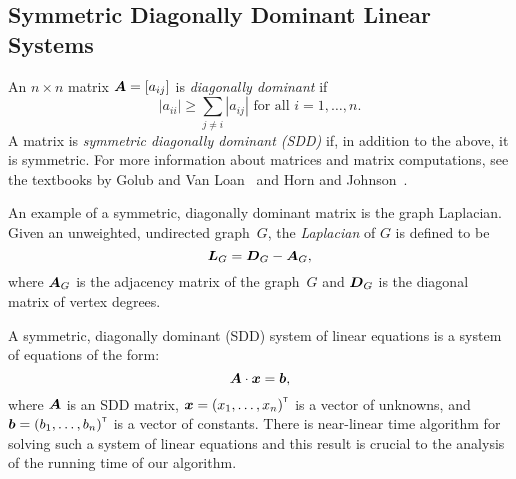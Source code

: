 \subsection{Symmetric Diagonally Dominant Linear Systems}

An $n \times n$ matrix $\boldsymbol{A} = [a_{ij}]$ is \emph{diagonally dominant} if 
\[
	|a_{ii}| \geq \sum_{j \neq i} {|a_{ij}|} \mbox{ for all } i = 1, \ldots, n.
\] 
A matrix is \emph{symmetric diagonally dominant (SDD)} if, in addition to the above, 
it is symmetric. For more information about matrices and matrix computations, 
see the textbooks by Golub and Van Loan~\cite{GvL13} and Horn and Johnson~\cite{HJ13}. 

An example of a symmetric, diagonally dominant matrix is the graph Laplacian. 
Given an unweighted, undirected graph~$G$, the \emph{Laplacian} of $G$ 
is defined to be 
\[
\boldsymbol{L}_G = \boldsymbol{D}_G - \boldsymbol{A}_G,
\] 
where $\boldsymbol{A}_G$ is the adjacency matrix of the graph~$G$ and $\boldsymbol{D}_G$ 
is the diagonal matrix of vertex degrees. 


A symmetric, diagonally dominant (SDD) system of linear equations is a system of 
equations of the form:
\[
	\boldsymbol{A} \cdot \boldsymbol{x} = \boldsymbol{b},
\]
where $\boldsymbol{A}$ is an SDD matrix, $\boldsymbol{x} = {(x_1, \ldots, x_n)}^{\scriptscriptstyle \mathsf{T}}$ 
is a vector of unknowns, and $\boldsymbol{b} = {(b_1, \ldots, b_n)}^{\scriptscriptstyle \mathsf{T}}$ is a vector of constants. 
There is near-linear time algorithm for solving such a system of linear equations 
and this result is crucial to the analysis of the running time of our algorithm. 

